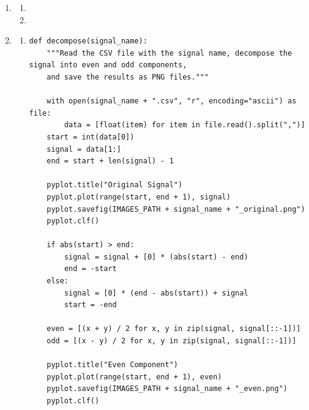 \documentclass[10pt,a4paper, margin=1in]{article}
\begin{document}
\begin{enumerate}
\item %
    \begin{enumerate}
    \item %
    \item %
    \end{enumerate}
    
\item %
    \begin{enumerate}
    \item \hfill\begin{verbatim}
def decompose(signal_name):
    """Read the CSV file with the signal name, decompose the signal into even and odd components,
    and save the results as PNG files."""

    with open(signal_name + ".csv", "r", encoding="ascii") as file:
        data = [float(item) for item in file.read().split(",")]
    start = int(data[0])
    signal = data[1:]
    end = start + len(signal) - 1

    pyplot.title("Original Signal")
    pyplot.plot(range(start, end + 1), signal)
    pyplot.savefig(IMAGES_PATH + signal_name + "_original.png")
    pyplot.clf()

    if abs(start) > end:
        signal = signal + [0] * (abs(start) - end)
        end = -start
    else:
        signal = [0] * (end - abs(start)) + signal
        start = -end

    even = [(x + y) / 2 for x, y in zip(signal, signal[::-1])]
    odd = [(x - y) / 2 for x, y in zip(signal, signal[::-1])]

    pyplot.title("Even Component")
    pyplot.plot(range(start, end + 1), even)
    pyplot.savefig(IMAGES_PATH + signal_name + "_even.png")
    pyplot.clf()


\end{verbatim}
\end{enumerate}
\end{enumerate}
\end{document}
